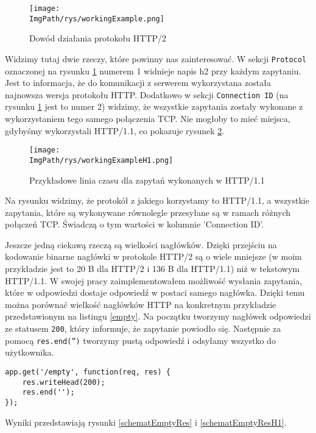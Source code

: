 \documentclass[a4paper,12pt,twoside,openany]{report}
\newcommand{\ImgPath}{.}
\begin{document}
\begin{figure}[!htbp]
	\begin{center}
\centering
\texttt{[image: \\ImgPath/rys/workingExample.png]}
\end{center}
	\caption{Dowód działania protokołu HTTP/2}
	\label{schematWorkingExample}
\end{figure}

Widzimy tutaj dwie rzeczy, które powinny nas zainteresować. W sekcji \texttt{Protocol} oznaczonej na rysunku \ref{schematWorkingExample} numerem 1 widnieje napis h2 przy każdym zapytaniu.
Jest to informacja, że do komunikacji z serwerem wykorzystana została najnowsza wersja protokołu HTTP.
Dodatkowo w sekcji \texttt{Connection ID} (na rysunku \ref{schematWorkingExample} jest to numer 2) widzimy, że wszystkie zapytania zostały wykonane z wykorzystaniem tego samego połączenia TCP.
Nie mogłoby to mieć miejsca, gdybyśmy wykorzystali HTTP/1.1, co pokazuje rysunek \ref{schematWorkingExampleH1}.

\begin{figure}[!htbp]
	\begin{center}
\centering
\texttt{[image: \\ImgPath/rys/workingExampleH1.png]}
\end{center}
	\caption{Przykładowe linia czasu dla zapytań wykonanych w HTTP/1.1}
	\label{schematWorkingExampleH1}
\end{figure}

Na rysunku widzimy, że protokół z jakiego korzystamy to HTTP/1.1, a wszystkie zapytania, które są wykonywane równolegle przesyłane są w ramach różnych połączeń TCP.
Świadczą o tym wartości w kolumnie 'Connection ID'.

Jeszcze jedną ciekawą rzeczą są wielkości nagłówków.
Dzięki przejściu na kodowanie binarne nagłówki w protokole HTTP/2 są o wiele mniejsze (w moim przykładzie jest to 20 B dla HTTP/2 i 136 B dla HTTP/1.1) niż w tekstowym HTTP/1.1.
W swojej pracy zaimplementowałem możliwość wysłania zapytania, które w odpowiedzi dostaje odpowiedź w postaci samego nagłówka.
Dzięki temu można porównać wielkość nagłówków HTTP na konkretnym przykładzie przedstawionym na listingu \ref{empty}.
Na początku tworzymy nagłówek odpowiedzi ze statusem \texttt{200}, który informuje, że zapytanie powiodło się.
Następnie za pomocą \texttt{res.end('')} tworzymy pustą odpowiedź i odsyłamy wszystko do użytkownika.

\begin{lstlisting}[caption=Wygląd funkcji wykonywanej po wykonaniu zapytania \texttt{GET} na adres \texttt{/empty}, label=empty]
app.get('/empty', function(req, res) {
	res.writeHead(200);
	res.end('');
});
\end{lstlisting}
Wyniki przedstawiają rysunki \ref{schematEmptyRes} i \ref{schematEmptyResH1}.
\end{document}
